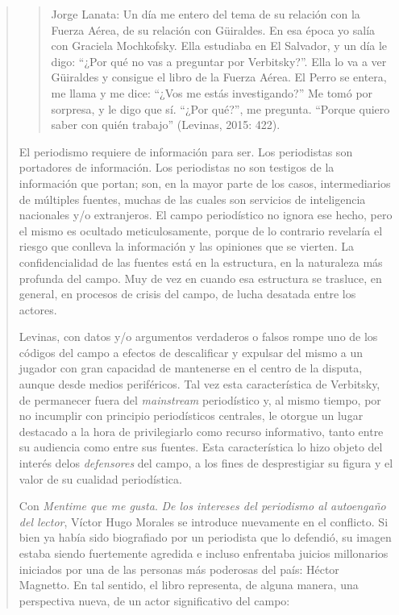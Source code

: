 \begin{quote}
\begin{quote}
	Jorge Lanata: Un día me entero del tema de su relación con la Fuerza Aérea, de su relación con Güiraldes. En esa época yo salía con Graciela Mochkofsky. Ella estudiaba en El Salvador, y un día le digo: \enquote{¿Por qué no vas a preguntar por Verbitsky?}. Ella lo va a ver Güiraldes y consigue el libro de la Fuerza Aérea. El Perro se entera, me llama y me dice: \enquote{¿Vos me estás investigando?} Me tomó por sorpresa, y le digo que sí. \enquote{¿Por qué?}, me pregunta. \enquote{Porque quiero saber con quién trabajo} (Levinas, 2015: 422).
\end{quote}


El periodismo requiere de información para ser. Los periodistas son portadores de información. Los periodistas no son testigos de la información que portan; son, en la mayor parte de los casos, intermediarios de múltiples fuentes, muchas de las cuales son servicios de inteligencia nacionales y/o extranjeros. El campo periodístico no ignora ese hecho, pero el mismo es ocultado meticulosamente, porque de lo contrario revelaría el riesgo que conlleva la información y las opiniones que se vierten. La confidencialidad de las fuentes está en la estructura, en la naturaleza más profunda del campo. Muy de vez en cuando esa estructura se trasluce, en general, en procesos de crisis del campo, de lucha desatada entre los actores.

Levinas, con datos y/o argumentos verdaderos o falsos rompe uno de los códigos del campo a efectos de descalificar y expulsar del mismo a un jugador con gran capacidad de mantenerse en el centro de la disputa, aunque desde medios periféricos. Tal vez esta característica de Verbitsky, de permanecer fuera del \emph{mainstream} periodístico y, al mismo tiempo, por no incumplir con principio periodísticos centrales, le otorgue un lugar destacado a la hora de privilegiarlo como recurso informativo, tanto entre su audiencia como entre sus fuentes. Esta característica lo hizo objeto del interés delos \emph{defensores} del campo, a los fines de desprestigiar su figura y el valor de su cualidad periodística.

Con \emph{Mentime que me gusta}. \emph{De los intereses del periodismo al autoengaño del lector}, Víctor Hugo Morales se introduce nuevamente en el conflicto. Si bien ya había sido biografiado por un periodista que lo defendió, su imagen estaba siendo fuertemente agredida e incluso enfrentaba juicios millonarios iniciados por una de las personas más poderosas del país: Héctor Magnetto. En tal sentido, el libro representa, de alguna manera, una perspectiva nueva, de un actor significativo del campo:


\end{quote}
